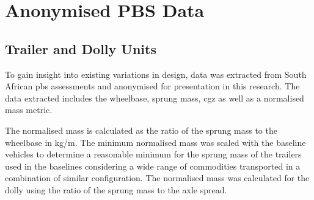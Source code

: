 \chapter{Anonymised PBS Data}\label{appendix:anonymised-pbs-data}
\section{Trailer and Dolly Units}\label{appendix:anonymised-pbs-data-trailer-and-dolly-units}
To gain insight into existing variations in design, data was extracted from South African \gls{pbs} assessments and anonymised for presentation in this research. The data extracted includes the wheelbase, sprung mass, \gls{cgz} as well as a normalised mass metric.

The normalised mass is calculated as the ratio of the sprung mass to the wheelbase in kg/m. The minimum  normalised mass was scaled with the baseline vehicles to determine a reasonable minimum for the sprung mass of the trailers used in the baselines considering a wide range of commodities transported in a combination of similar configuration. The normalised mass was calculated for the dolly using the ratio of the sprung mass to the axle spread.

